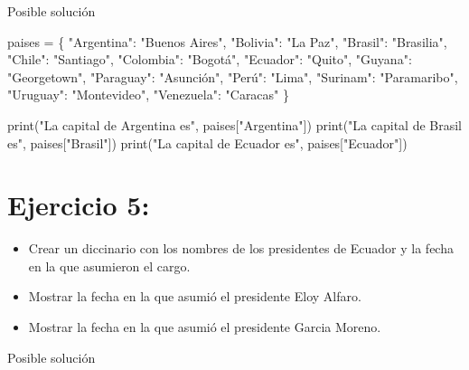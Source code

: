 \documentclass[
  a4paper,
  DIV=11,
  numbers=noendperiod,
  onepage,
  openany]{scrreprt}
\newenvironment{Shaded}{\begin{snugshade}}{\end{snugshade}}
\newcommand{\BuiltInTok}[1]{\textcolor[rgb]{0.00,0.23,0.31}{#1}}
\newcommand{\NormalTok}[1]{\textcolor[rgb]{0.00,0.23,0.31}{#1}}
\newcommand{\OperatorTok}[1]{\textcolor[rgb]{0.37,0.37,0.37}{#1}}
\newcommand{\StringTok}[1]{\textcolor[rgb]{0.13,0.47,0.30}{#1}}
\providecommand{\tightlist}{%
  \setlength{\itemsep}{0pt}\setlength{\parskip}{0pt}}\usepackage{longtable,booktabs,array}
\begin{document}
Posible solución

\begin{Shaded}
\begin{Highlighting}[]
\NormalTok{paises }\OperatorTok{=}\NormalTok{ \{}
    \StringTok{"Argentina"}\NormalTok{: }\StringTok{"Buenos Aires"}\NormalTok{,}
    \StringTok{"Bolivia"}\NormalTok{: }\StringTok{"La Paz"}\NormalTok{,}
    \StringTok{"Brasil"}\NormalTok{: }\StringTok{"Brasilia"}\NormalTok{,}
    \StringTok{"Chile"}\NormalTok{: }\StringTok{"Santiago"}\NormalTok{,}
    \StringTok{"Colombia"}\NormalTok{: }\StringTok{"Bogotá"}\NormalTok{,}
    \StringTok{"Ecuador"}\NormalTok{: }\StringTok{"Quito"}\NormalTok{,}
    \StringTok{"Guyana"}\NormalTok{: }\StringTok{"Georgetown"}\NormalTok{,}
    \StringTok{"Paraguay"}\NormalTok{: }\StringTok{"Asunción"}\NormalTok{,}
    \StringTok{"Perú"}\NormalTok{: }\StringTok{"Lima"}\NormalTok{,}
    \StringTok{"Surinam"}\NormalTok{: }\StringTok{"Paramaribo"}\NormalTok{,}
    \StringTok{"Uruguay"}\NormalTok{: }\StringTok{"Montevideo"}\NormalTok{,}
    \StringTok{"Venezuela"}\NormalTok{: }\StringTok{"Caracas"}
\NormalTok{\}}

\BuiltInTok{print}\NormalTok{(}\StringTok{"La capital de Argentina es"}\NormalTok{, paises[}\StringTok{"Argentina"}\NormalTok{])}
\BuiltInTok{print}\NormalTok{(}\StringTok{"La capital de Brasil es"}\NormalTok{, paises[}\StringTok{"Brasil"}\NormalTok{])}
\BuiltInTok{print}\NormalTok{(}\StringTok{"La capital de Ecuador es"}\NormalTok{, paises[}\StringTok{"Ecuador"}\NormalTok{])}
\end{Highlighting}
\end{Shaded}

\section{Ejercicio 5:}\label{ejercicio-5-4}

\begin{itemize}
\tightlist
\item
  Crear un diccinario con los nombres de los presidentes de Ecuador y la
  fecha en la que asumieron el cargo.
\item
  Mostrar la fecha en la que asumió el presidente Eloy Alfaro.
\item
  Mostrar la fecha en la que asumió el presidente Garcia Moreno.
\end{itemize}

Posible solución
\end{document}
